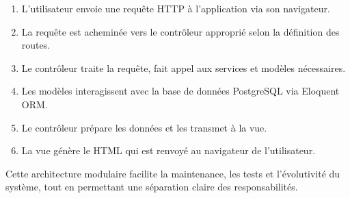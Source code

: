 \begin{enumerate}
    \item L'utilisateur envoie une requête HTTP à l'application via son navigateur.
    \item La requête est acheminée vers le contrôleur approprié selon la définition des routes.
    \item Le contrôleur traite la requête, fait appel aux services et modèles nécessaires.
    \item Les modèles interagissent avec la base de données PostgreSQL via Eloquent ORM.
    \item Le contrôleur prépare les données et les transmet à la vue.
    \item La vue génère le HTML qui est renvoyé au navigateur de l'utilisateur.
\end{enumerate}

Cette architecture modulaire facilite la maintenance, les tests et l'évolutivité du système, tout en permettant une séparation claire des responsabilités.